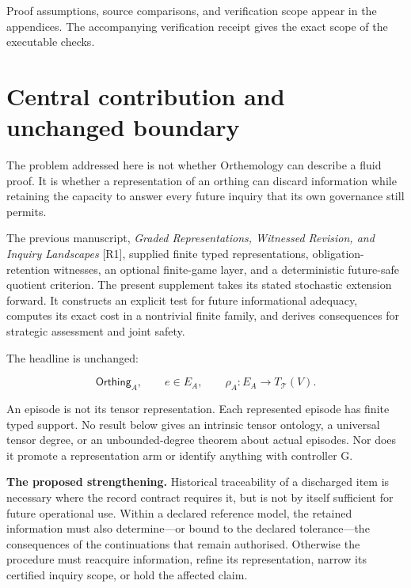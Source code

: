 \documentclass[11pt,a4paper]{article}
\begin{document}
\tableofcontents
\vspace{8mm}
{\small\color{softink} Proof assumptions, source comparisons, and verification scope appear in the appendices. The accompanying verification receipt gives the exact scope of the executable checks.}
\clearpage
{}
\section{Central contribution and unchanged
boundary}\label{central-contribution-and-unchanged-boundary}

The problem addressed here is not whether Orthemology can describe a
fluid proof. It is whether a representation of an orthing can discard
information while retaining the capacity to answer every future inquiry
that its own governance still permits.

The previous manuscript, \emph{Graded Representations, Witnessed
Revision, and Inquiry Landscapes} {[}R1{]}, supplied finite typed
representations, obligation-retention witnesses, an optional finite-game
layer, and a deterministic future-safe quotient criterion. The present
supplement takes its stated stochastic extension forward. It constructs
an explicit test for future informational adequacy, computes its exact
cost in a nontrivial finite family, and derives consequences for
strategic assessment and joint safety.

The headline is unchanged:

\nopagebreak[4]

\[
\mathsf{Orthing}_A,\qquad e\in E_A,\qquad
\rho_A:E_A\longrightarrow T_{\mathcal T}(V).
\]

An episode is not its tensor representation. Each represented episode
has finite typed support. No result below gives an intrinsic tensor
ontology, a universal tensor degree, or an unbounded-degree theorem
about actual episodes. Nor does it promote a representation arm or
identify anything with controller G.

\textbf{The proposed strengthening.} Historical traceability of a
discharged item is necessary where the record contract requires it, but
is not by itself sufficient for future operational use. Within a
declared reference model, the retained information must also
determine---or bound to the declared tolerance---the consequences of the
continuations that remain authorised. Otherwise the procedure must
reacquire information, refine its representation, narrow its certified
inquiry scope, or hold the affected claim.
\end{document}
